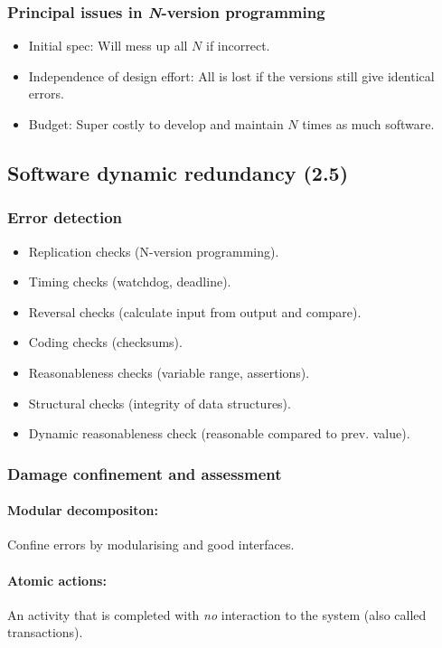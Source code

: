 \documentclass[a4paper, 12pt]{article}
\begin{document}
\subsubsection{Principal issues in \textit{N}-version programming}
\begin{itemize}
	\item Initial spec: Will mess up all \(N\) if incorrect.
	\item Independence of design effort: All is lost if the versions still give identical errors.
	\item Budget: Super costly to develop and maintain \(N\) times as much software.
\end{itemize}

\subsection{Software dynamic redundancy (2.5)}
\subsubsection{Error detection}
\begin{itemize}
	\item Replication checks (N-version programming).
	\item Timing checks (watchdog, deadline).
	\item Reversal checks (calculate input from output and compare).
	\item Coding checks (checksums).
	\item Reasonableness checks (variable range, assertions).
	\item Structural checks (integrity of data structures).
	\item Dynamic reasonableness check (reasonable compared to prev. value).
\end{itemize}

\subsubsection{Damage confinement and assessment}
\paragraph{Modular decompositon:} Confine errors by modularising and good interfaces.
\paragraph{Atomic actions:} An activity that is completed with \emph{no} interaction to the system (also called transactions).
\end{document}
